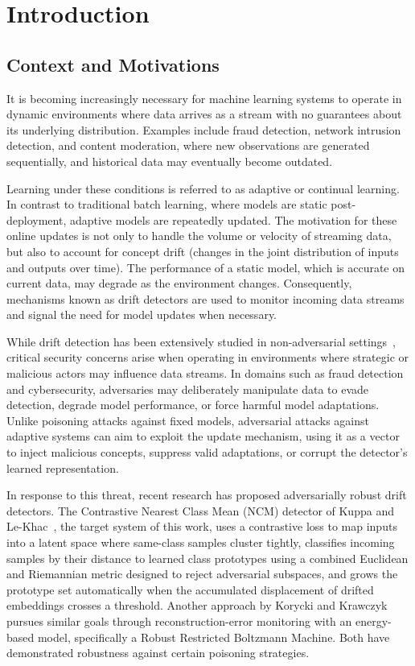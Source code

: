 \chapter{Introduction}
\label{ch:introduction}

\section{Context and Motivations}
It is becoming increasingly necessary for machine learning systems to operate in dynamic environments where data arrives as a stream with no guarantees about its underlying distribution. Examples include fraud detection, network intrusion detection, and content moderation, where new observations are generated sequentially, and historical data may eventually become outdated.

Learning under these conditions is referred to as adaptive or continual learning. In contrast to traditional batch learning, where models are static post-deployment, adaptive models are repeatedly updated. The motivation for these online updates is not only to handle the volume or velocity of streaming data, but also to account for concept drift (changes in the joint distribution of inputs and outputs over time). The performance of a static model, which is accurate on current data, may degrade as the environment changes. Consequently, mechanisms known as drift detectors are used to monitor incoming data streams and signal the need for model updates when necessary.

While drift detection has been extensively studied in non-adversarial settings~\cite{Gao_2007, Gama_2014, Barros_2018}, critical security concerns arise when operating in environments where strategic or malicious actors may influence data streams. In domains such as fraud detection and cybersecurity, adversaries may deliberately manipulate data to evade detection, degrade model performance, or force harmful model adaptations. Unlike poisoning attacks against fixed models, adversarial attacks against adaptive systems can aim to exploit the update mechanism, using it as a vector to inject malicious concepts, suppress valid adaptations, or corrupt the detector's learned representation.

In response to this threat, recent research has proposed adversarially robust drift detectors. The Contrastive Nearest Class Mean (NCM) detector of Kuppa and Le-Khac~\cite{Kuppa_2022}, the target system of this work, uses a contrastive loss to map inputs into a latent space where same-class samples cluster tightly, classifies incoming samples by their distance to learned class prototypes using a combined Euclidean and Riemannian metric designed to reject adversarial subspaces, and grows the prototype set automatically when the accumulated displacement of drifted embeddings crosses a threshold. Another approach by Korycki and Krawczyk~\cite{Korycki_2022} pursues similar goals through reconstruction-error monitoring with an energy-based model, specifically a Robust Restricted Boltzmann Machine. Both have demonstrated robustness against certain poisoning strategies.

